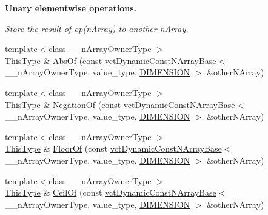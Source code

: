 \begin{Indent}{\bf Unary elementwise operations.}\par
{\em Store the result of op(n\+Array) to another n\+Array. }\begin{DoxyCompactItemize}
\item 
{\footnotesize template$<$class \+\_\+\+\_\+n\+Array\+Owner\+Type $>$ }\\\hyperlink{classvct_dynamic_const_n_array_base_a5123caffcf1455a1b99003877eade897}{This\+Type} \& \hyperlink{classvct_dynamic_n_array_base_a30fb32bc1fbca7bccf98549277320044}{Abs\+Of} (const \hyperlink{classvct_dynamic_const_n_array_base}{vct\+Dynamic\+Const\+N\+Array\+Base}$<$ \+\_\+\+\_\+n\+Array\+Owner\+Type, value\+\_\+type, \hyperlink{classvct_dynamic_n_array_base_aa66532d28588bdf26d08fb593db815d6abfcde386ec801b212d7c42d63a4f3837}{D\+I\+M\+E\+N\+S\+I\+O\+N} $>$ \&other\+N\+Array)
\item 
{\footnotesize template$<$class \+\_\+\+\_\+n\+Array\+Owner\+Type $>$ }\\\hyperlink{classvct_dynamic_const_n_array_base_a5123caffcf1455a1b99003877eade897}{This\+Type} \& \hyperlink{classvct_dynamic_n_array_base_a9c13418c002b516901736f04372dda45}{Negation\+Of} (const \hyperlink{classvct_dynamic_const_n_array_base}{vct\+Dynamic\+Const\+N\+Array\+Base}$<$ \+\_\+\+\_\+n\+Array\+Owner\+Type, value\+\_\+type, \hyperlink{classvct_dynamic_n_array_base_aa66532d28588bdf26d08fb593db815d6abfcde386ec801b212d7c42d63a4f3837}{D\+I\+M\+E\+N\+S\+I\+O\+N} $>$ \&other\+N\+Array)
\item 
{\footnotesize template$<$class \+\_\+\+\_\+n\+Array\+Owner\+Type $>$ }\\\hyperlink{classvct_dynamic_const_n_array_base_a5123caffcf1455a1b99003877eade897}{This\+Type} \& \hyperlink{classvct_dynamic_n_array_base_a3963f50326be7a30133898aef20e7ab0}{Floor\+Of} (const \hyperlink{classvct_dynamic_const_n_array_base}{vct\+Dynamic\+Const\+N\+Array\+Base}$<$ \+\_\+\+\_\+n\+Array\+Owner\+Type, value\+\_\+type, \hyperlink{classvct_dynamic_n_array_base_aa66532d28588bdf26d08fb593db815d6abfcde386ec801b212d7c42d63a4f3837}{D\+I\+M\+E\+N\+S\+I\+O\+N} $>$ \&other\+N\+Array)
\item 
{\footnotesize template$<$class \+\_\+\+\_\+n\+Array\+Owner\+Type $>$ }\\\hyperlink{classvct_dynamic_const_n_array_base_a5123caffcf1455a1b99003877eade897}{This\+Type} \& \hyperlink{classvct_dynamic_n_array_base_aab97377ed3f9ef2de202add75ab7ffff}{Ceil\+Of} (const \hyperlink{classvct_dynamic_const_n_array_base}{vct\+Dynamic\+Const\+N\+Array\+Base}$<$ \+\_\+\+\_\+n\+Array\+Owner\+Type, value\+\_\+type, \hyperlink{classvct_dynamic_n_array_base_aa66532d28588bdf26d08fb593db815d6abfcde386ec801b212d7c42d63a4f3837}{D\+I\+M\+E\+N\+S\+I\+O\+N} $>$ \&other\+N\+Array)
\end{DoxyCompactItemize}
\end{Indent}
